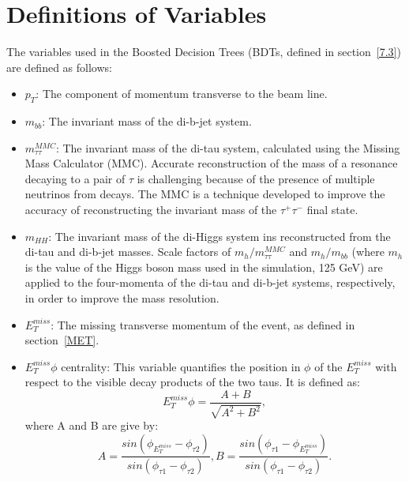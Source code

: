 \section{Definitions of Variables}
\label{variables} The variables used in the Boosted Decision Trees (BDTs, defined in section~\ref{7.3}) are defined as follows:
\begin{itemize}
    \item $p_{T}$: The component of momentum transverse to the beam line.
    \item $m_{bb}$: The invariant mass of the di-b-jet system.
    \item $m_{\tau\tau}^{MMC}$: The invariant mass of the di-tau system, calculated using the Missing Mass Calculator (MMC). Accurate reconstruction of the mass of a resonance decaying to a pair of $\tau$ is challenging because of the presence of multiple neutrinos from decays.  The MMC is a technique  developed to improve the accuracy of reconstructing the invariant mass of the $\tau^+\tau^-$ final state\cite{MMC}.
    \item $m_{HH}$: The invariant mass of the di-Higgs system ins reconstructed from the di-tau and di-b-jet masses. Scale factors of $m_h/m_{\tau\tau}^{MMC}$ and $m_h/m_{bb}$ (where $m_h$ is the value of the Higgs boson mass used in the simulation, 125 GeV) are applied to the four-momenta of the di-tau and di-b-jet systems, respectively, in order to improve the mass resolution. 
    \item $E^{miss}_T$: The missing transverse momentum of the event, as defined in section~\ref{MET}.
    \item $E^{miss}_T\phi$ centrality: This variable quantifies the position in $\phi$ of the $E^{miss}_T$ with respect to the visible decay products of the two taus. It is defined as:
    \begin{equation} \label{eq:mTWcentrality} 
E^{miss}_T\phi = \frac{A+B}{\sqrt{A^2+B^2}}, 
\end{equation}
where A and B are give by:
\begin{equation} \label{eq:AB} 
A = \frac{sin(\phi_{E_T^{miss}}-\phi_{\tau2})}{sin(\phi_{\tau1}-\phi_{\tau2})}, B = \frac{sin(\phi_{\tau1}-\phi_{E_{T}^{miss}})}{sin(\phi_{\tau1}-\phi_{\tau2})}.
\end{equation}


\end{itemize}
